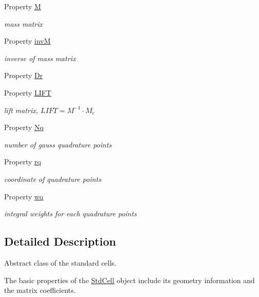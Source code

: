 \begin{DoxyCompactItemize}
Property \hyperlink{class_std_cell_a4fc88b4808c8c9f3d4bab5b2eea4bbc7}{M}
\begin{DoxyCompactList}\small\item\em mass matrix \end{DoxyCompactList}\item 
Property \hyperlink{class_std_cell_aa71e49dcf0945c930aafefe1c9998d56}{invM}
\begin{DoxyCompactList}\small\item\em inverse of mass matrix \end{DoxyCompactList}\item 
Property \hyperlink{class_std_cell_aa45959b49673cc3d78c2994df7e6142c}{Dr}
\item 
Property \hyperlink{class_std_cell_ac143bef5a48fb2137cb3937b2ffba36d}{L\+I\+FT}
\begin{DoxyCompactList}\small\item\em lift matrix, $ LIFT = M^{-1} \cdot M_e $ \end{DoxyCompactList}\item 
Property \hyperlink{class_std_cell_aede2d7d32ffc435a37c1f47af06a1127}{Nq}
\begin{DoxyCompactList}\small\item\em number of gauss quadrature points \end{DoxyCompactList}\item 
Property \hyperlink{class_std_cell_a5eaee3fe41eea014df903849502ed0b3}{rq}
\begin{DoxyCompactList}\small\item\em coordinate of quadrature points \end{DoxyCompactList}\item 
Property \hyperlink{class_std_cell_aa3ef53c6adecba5176667c0a38a178ee}{wq}
\begin{DoxyCompactList}\small\item\em integral weights for each quadrature points \end{DoxyCompactList}\end{DoxyCompactItemize}


\subsection{Detailed Description}
Abstract class of the standard cells. 

The basic properties of the \hyperlink{class_std_cell}{Std\+Cell} object include its geometry information and the matrix coefficients.


